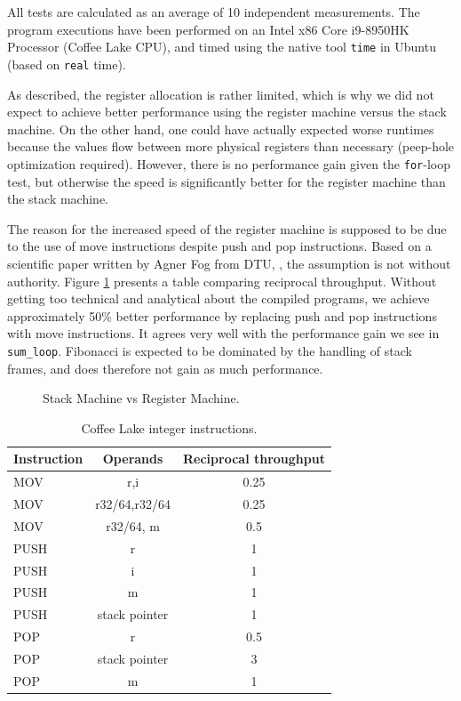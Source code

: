 All tests are calculated as an average of 10 independent measurements. The program executions have been performed on an Intel x86 Core i9-8950HK Processor (Coffee Lake CPU), and timed using the native tool \texttt{time} in Ubuntu (based on \texttt{real} time).

As described, the register allocation is rather limited, which is why we did not expect to achieve better performance using the register machine versus the stack machine. On the other hand, one could have actually expected worse runtimes because the values flow between more physical registers than necessary (peep-hole optimization required). However, there is no performance gain given the \texttt{for}-loop test, but otherwise the speed is significantly better for the register machine than the stack machine.

The reason for the increased speed of the register machine is supposed to be due to the use of move instructions despite push and pop instructions. Based on a scientific paper written by Agner Fog from DTU, \cite[314-315]{instruction}, the assumption is not without authority. Figure \ref{tab:instruction_table} presents a table comparing reciprocal throughput. Without getting too technical and analytical about the compiled programs, we achieve approximately 50\% better performance by replacing push and pop instructions with move instructions. It agrees very well with the performance gain we see in \texttt{sum\_loop}. Fibonacci is expected to be dominated by the handling of stack frames, and does therefore not gain as much performance.


\begin{figure}[h]
    \centering
    
    \caption{Stack Machine vs Register Machine.}
    \label{fig:performance_comparison}
\end{figure}

\begin{table}[h]
    \centering
    \begin{tabular}{l|c|c}
        Instruction  & Operands &  Reciprocal throughput \\ \hline
        MOV & r,i & 0.25 \\\hline
        MOV & r32/64,r32/64 & 0.25\\ \hline
        MOV & r32/64, m & 0.5 \\\hline
        PUSH & r & 1 \\\hline
        PUSH & i & 1 \\\hline
        PUSH & m & 1 \\\hline
        PUSH & stack pointer & 1 \\\hline
        POP & r & 0.5 \\\hline
        POP & stack pointer & 3 \\\hline
        POP & m & 1
    \end{tabular}
    \caption{Coffee Lake integer instructions.}
    \label{tab:instruction_table}
\end{table}

